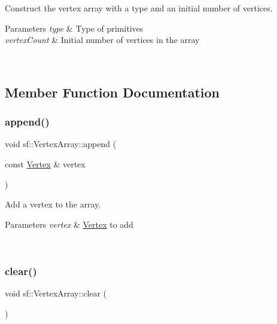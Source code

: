 Construct the vertex array with a type and an initial number of vertices. 


\begin{DoxyParams}{Parameters}
{\em type} & Type of primitives \\
\hline
{\em vertex\+Count} & Initial number of vertices in the array \begin{DoxyVerb}\end{DoxyVerb}
 \\
\hline
\end{DoxyParams}


\subsection{Member Function Documentation}
\mbox{\label{classsf_1_1_vertex_array_a80c8f6865e53bd21fc6cb10fffa10035}} 
\subsubsection{\texorpdfstring{append()}{append()}}
{\footnotesize\ttfamily void sf\+::\+Vertex\+Array\+::append (\begin{DoxyParamCaption}\item[{const \mbox{\hyperlink{classsf_1_1_vertex}{Vertex}} \&}]{vertex }\end{DoxyParamCaption})}



Add a vertex to the array. 


\begin{DoxyParams}{Parameters}
{\em vertex} & \mbox{\hyperlink{classsf_1_1_vertex}{Vertex}} to add \begin{DoxyVerb}\end{DoxyVerb}
 \\
\hline
\end{DoxyParams}
\mbox{\label{classsf_1_1_vertex_array_a3654c424aca1f9e468f369bc777c839c}} 
\subsubsection{\texorpdfstring{clear()}{clear()}}
{\footnotesize\ttfamily void sf\+::\+Vertex\+Array\+::clear (\begin{DoxyParamCaption}{ }\end{DoxyParamCaption})}



